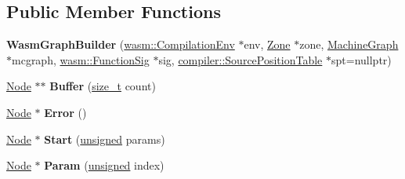 \subsection*{Public Member Functions}
\begin{DoxyCompactItemize}
\item 
\mbox{\label{classv8_1_1internal_1_1compiler_1_1WasmGraphBuilder_ad1b1dccd1c9945bec2ae074ad5a9908a}} 
{\bfseries Wasm\+Graph\+Builder} (\mbox{\hyperlink{structv8_1_1internal_1_1wasm_1_1CompilationEnv}{wasm\+::\+Compilation\+Env}} $\ast$env, \mbox{\hyperlink{classv8_1_1internal_1_1Zone}{Zone}} $\ast$zone, \mbox{\hyperlink{classv8_1_1internal_1_1compiler_1_1MachineGraph}{Machine\+Graph}} $\ast$mcgraph, \mbox{\hyperlink{classv8_1_1internal_1_1Signature}{wasm\+::\+Function\+Sig}} $\ast$sig, \mbox{\hyperlink{classv8_1_1internal_1_1compiler_1_1SourcePositionTable}{compiler\+::\+Source\+Position\+Table}} $\ast$spt=nullptr)
\item 
\mbox{\label{classv8_1_1internal_1_1compiler_1_1WasmGraphBuilder_a924252c21b42b5a78c148854e8e21e08}} 
\mbox{\hyperlink{classv8_1_1internal_1_1compiler_1_1Node}{Node}} $\ast$$\ast$ {\bfseries Buffer} (\mbox{\hyperlink{classsize__t}{size\+\_\+t}} count)
\item 
\mbox{\label{classv8_1_1internal_1_1compiler_1_1WasmGraphBuilder_a12010451052b3336633e95852d7574ea}} 
\mbox{\hyperlink{classv8_1_1internal_1_1compiler_1_1Node}{Node}} $\ast$ {\bfseries Error} ()
\item 
\mbox{\label{classv8_1_1internal_1_1compiler_1_1WasmGraphBuilder_a92ca9c114840c6f96ce8d19d4cef501c}} 
\mbox{\hyperlink{classv8_1_1internal_1_1compiler_1_1Node}{Node}} $\ast$ {\bfseries Start} (\mbox{\hyperlink{classunsigned}{unsigned}} params)
\item 
\mbox{\label{classv8_1_1internal_1_1compiler_1_1WasmGraphBuilder_ae7cebcacd90aded04778227d8721f795}} 
\mbox{\hyperlink{classv8_1_1internal_1_1compiler_1_1Node}{Node}} $\ast$ {\bfseries Param} (\mbox{\hyperlink{classunsigned}{unsigned}} index)
\item 
$$
\end{DoxyCompactItemize}
